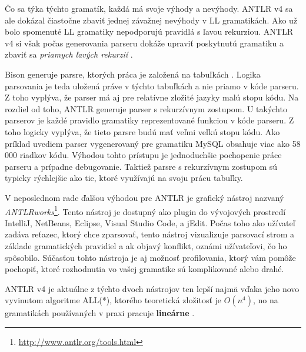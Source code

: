 Čo sa týka týchto gramatík, každá má svoje výhody a nevýhody. ANTLR v4 sa ale dokázal čiastočne zbaviť jednej závažnej nevýhody v LL gramatikách. Ako už bolo spomenuté LL gramatiky nepodporujú pravidlá s ľavou rekurziou. ANTLR v4 si však počas generovania parseru dokáže upraviť poskytnutú gramatiku a zbaviť sa \textit{priamych ľavých rekurzií} \cite{ALL}.

Bison generuje parsre, ktorých práca je založená na tabuľkách \cite{IELR}. Logika parsovania je teda uložená práve v týchto tabuľkách a nie priamo v kóde parseru. Z toho vyplýva, že parser má aj pre relatívne zložité jazyky malú stopu kódu. Na rozdiel od toho, ANTLR generuje parser s rekurzívnym zostupom. U takýchto parserov je každé pravidlo gramatiky reprezentované funkciou v kóde parseru. Z toho logicky vyplýva, že tieto parsre budú mať veľmi veľkú stopu kódu. Ako príklad uvediem parser vygenerovaný pre gramatiku MySQL obsahuje viac ako 58 000 riadkov kódu. Výhodou tohto prístupu je jednoduchšie pochopenie práce parseru a prípadne debugovanie. Taktiež parsre s rekurzívnym zostupom sú typicky rýchlejšie ako tie, ktoré využívajú na svoju prácu tabuľky. 

V neposlednom rade ďalšou výhodou pre ANTLR je grafický nástroj nazvaný \textit{ANTLRworks}\footnote{\url{http://www.antlr.org/tools.html}}. Tento nástroj je dostupný ako plugin do vývojových prostredí IntelliJ, NetBeans, Eclipse, Visual Studio Code, a jEdit. Počas toho ako užívateľ zadáva reťazec, ktorý chce zparsovať, tento nástroj vizualizuje parsovací strom a základe gramatických pravidiel a ak objavý konflikt, oznámi užívateľovi, čo ho spôsobilo. Súčasťou tohto nástroja je aj možnosť profilovania, ktorý vám pomôže pochopiť, ktoré rozhodnutia vo vašej gramatike sú komplikované alebo drahé.

ANTLR v4 je aktuálne z týchto dvoch nástrojov ten lepší najmä vďaka jeho novo vyvinutom algoritme ALL(*), ktorého teoretická zložitosť je $O(n^4)$, no na gramatikách používaných v praxi pracuje \textbf{lineárne} \cite{ALL}.


